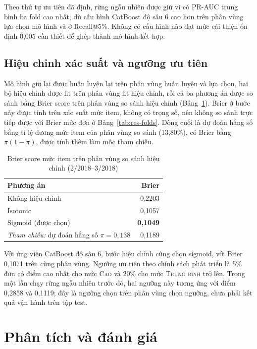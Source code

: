 \documentclass[12pt,a4paper]{report}
\begin{document}
Theo thứ tự ưu tiên đã định, rừng ngẫu nhiên được giữ vì có PR-AUC trung bình ba fold cao nhất, dù cấu hình CatBoost độ sâu 6 cao hơn trên phân vùng lựa chọn mô hình và ở Recall@5\%. Không có cấu hình nào đạt mức cải thiện ổn định 0,005 cần thiết để ghép thành mô hình kết hợp.

\subsection{Hiệu chỉnh xác suất và ngưỡng ưu tiên}\label{subsec:tab-calibration}

Mô hình giữ lại được huấn luyện lại trên phân vùng huấn luyện và lựa chọn, hai bộ hiệu chỉnh được fit trên phân vùng fit hiệu chỉnh, rồi cả ba phương án được so sánh bằng Brier score trên phân vùng so sánh hiệu chỉnh (Bảng~\ref{tab:res-calibration}). Brier ở bước này được tính trên xác suất mức item, không có trọng số, nên không so sánh trực tiếp được với Brier mức đơn ở Bảng~\ref{tab:res-folds}. Dòng cuối là dự đoán hằng số bằng tỉ lệ dương mức item của phân vùng so sánh (13,80\%), có Brier bằng $\pi(1-\pi)$, được tính thêm làm mốc tham chiếu.

\begin{table}[htbp]\centering\small
\caption{Brier score mức item trên phân vùng so sánh hiệu chỉnh (2/2018--3/2018)}\label{tab:res-calibration}
\begin{tabular}{lr}
\toprule
Phương án & Brier \\
\midrule
Không hiệu chỉnh & 0,2203 \\
Isotonic & 0,1057 \\
Sigmoid (được chọn) & \textbf{0,1049} \\
\midrule
\emph{Tham chiếu:} dự đoán hằng số $\pi = 0{,}138$ & 0,1189 \\
\bottomrule
\end{tabular}
\end{table}

Với ứng viên CatBoost độ sâu 6, bước hiệu chỉnh cũng chọn sigmoid, với Brier 0,1071 trên cùng phân vùng. Ngưỡng ưu tiên theo chính sách phát triển là 5\% đơn có điểm cao nhất cho mức \textsc{Cao} và 20\% cho mức \textsc{Trung bình} trở lên. Trong một lần chạy rừng ngẫu nhiên trước đó, hai ngưỡng này tương ứng với điểm 0,2858 và 0,1119; đây là ngưỡng chọn trên phân vùng chọn ngưỡng, chưa phải kết quả vận hành trên tập test.

\section{Phân tích và đánh giá}\label{sec:results-analysis}
\end{document}
